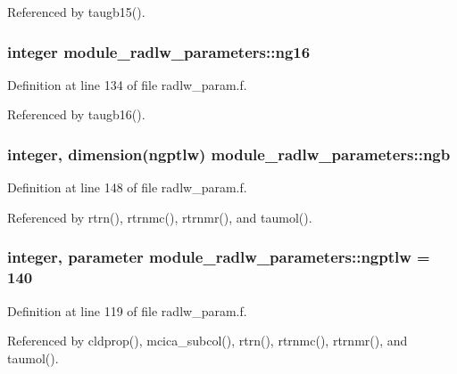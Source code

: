 Referenced by taugb15().

\subsubsection[{\texorpdfstring{ng16}{ng16}}]{\setlength{\rightskip}{0pt plus 5cm}integer module\+\_\+radlw\+\_\+parameters\+::ng16}\hypertarget{group__module__radlw__main_gaf6c5d2407ab29bb09fd2c297d4524e74}{}\label{group__module__radlw__main_gaf6c5d2407ab29bb09fd2c297d4524e74}


Definition at line 134 of file radlw\+\_\+param.\+f.



Referenced by taugb16().

\subsubsection[{\texorpdfstring{ngb}{ngb}}]{\setlength{\rightskip}{0pt plus 5cm}integer, dimension(ngptlw) module\+\_\+radlw\+\_\+parameters\+::ngb}\hypertarget{group__module__radlw__main_ga2c571bd14c9b7982a7968976858c7547}{}\label{group__module__radlw__main_ga2c571bd14c9b7982a7968976858c7547}


Definition at line 148 of file radlw\+\_\+param.\+f.



Referenced by rtrn(), rtrnmc(), rtrnmr(), and taumol().

\subsubsection[{\texorpdfstring{ngptlw}{ngptlw}}]{\setlength{\rightskip}{0pt plus 5cm}integer, parameter module\+\_\+radlw\+\_\+parameters\+::ngptlw = 140}\hypertarget{group__module__radlw__main_ga05fe17fe932ce62a3ae2c6c564584321}{}\label{group__module__radlw__main_ga05fe17fe932ce62a3ae2c6c564584321}


Definition at line 119 of file radlw\+\_\+param.\+f.



Referenced by cldprop(), mcica\+\_\+subcol(), rtrn(), rtrnmc(), rtrnmr(), and taumol().

